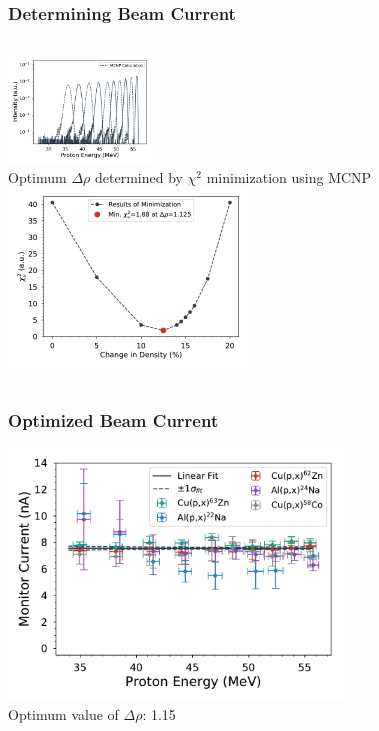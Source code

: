 \documentclass[12pt,xcolor=dvipsnames]{beamer}
\begin{document}
\begin{frame}
\frametitle{Determining Beam Current}
\begin{columns}[c]
\column{1.5in}
\includegraphics[width=1.5in]{monitors/La_mcnp_spectrum}
\\
Optimum $\Delta \rho$ determined by $\chi^2$ minimization using MCNP
\column{2.5in}
\includegraphics[width=2.5in]{monitors/minimize_mcnp}
\end{columns}
\end{frame}

\begin{frame}
\frametitle{Optimized Beam Current}
\includegraphics[width=3.5in]{monitors/current_norm_mcnp}
\\
Optimum value of $\Delta \rho$: 1.15
\end{frame}
\end{document}
